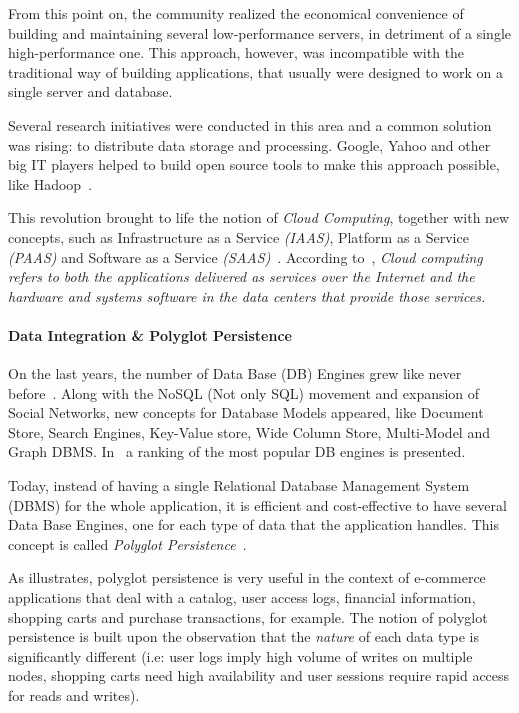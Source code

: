 \documentclass{article}
\begin{document}
From this point on, the community realized the economical convenience of building and maintaining several low-performance servers, in detriment of a single high-performance one.
This approach, however, was incompatible with the traditional way of building applications, that usually were designed to work on a single server and database. 

Several research initiatives were conducted in this area and a common solution was rising: to distribute data storage and processing. 
Google, Yahoo and other big IT players helped to build open source tools to make this approach possible, like Hadoop~\cite{5496972}.

This revolution brought to life the notion of \textit{Cloud Computing}, together with new concepts, such as Infrastructure as a Service \textit{(IAAS)}, Platform as a Service \textit{(PAAS)} and Software as a Service \textit{(SAAS)}~\cite{AViewOfCloudComputing}.
According to~\cite{AViewOfCloudComputing}, \textit{Cloud computing refers to both the applications delivered as services over the Internet and the hardware and systems software in the data centers that provide those services.} 


\paragraph*{Data Integration \& Polyglot Persistence}
On the last years, the number of Data Base (DB) Engines grew like never before~\cite{dbranking}. 
Along with the NoSQL (Not only SQL) movement and expansion of Social Networks, new concepts for Database Models appeared, like Document Store, Search Engines, Key-Value store, Wide Column Store, Multi-Model and Graph DBMS. 
In~\cite{dbranking} a ranking of the most popular DB engines is presented.

Today, instead of having a single Relational Database Management System (DBMS) for the whole application, it is efficient and cost-effective to have several Data Base Engines, one for each type of data that the application handles. 
This concept is called \textit{Polyglot Persistence}~\cite{sadalage2012nosql}.

As \cite{AdressingDataManagementCloud} illustrates, polyglot persistence is very useful in the context of  e-commerce applications that deal with a catalog, user access logs, financial information, shopping carts and purchase transactions, for example.
The notion of polyglot persistence is built upon the observation that the \textit{nature} of each data type is significantly different (i.e: user logs imply high volume of writes on multiple nodes, shopping carts need high availability and user sessions require rapid access for reads and writes). 
\end{document}
